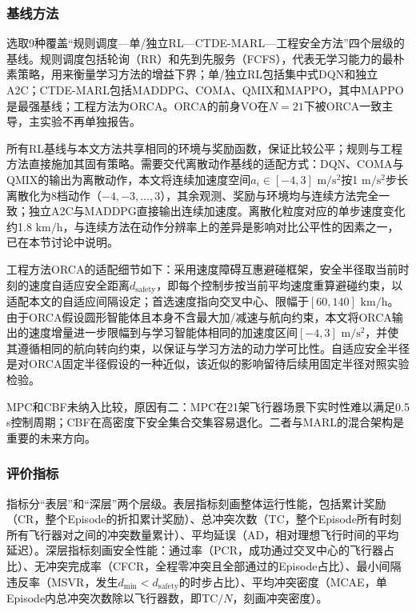 \documentclass[12pt,a4paper,UTF8]{ctexart}
\begin{document}
\subsubsection{基线方法}

选取9种覆盖“规则调度—单/独立RL—CTDE-MARL—工程安全方法”四个层级的基线。规则调度包括轮询（RR）和先到先服务（FCFS），代表无学习能力的最朴素策略，用来衡量学习方法的增益下界；单/独立RL包括集中式DQN和独立A2C；CTDE-MARL包括MADDPG、COMA、QMIX和MAPPO，其中MAPPO是最强基线；工程方法为ORCA\cite{ref4}。ORCA的前身VO在$N=21$下被ORCA一致主导，主实验不再单独报告。

所有RL基线与本文方法共享相同的环境与奖励函数，保证比较公平；规则与工程方法直接施加其固有策略。需要交代离散动作基线的适配方式：DQN、COMA与QMIX的输出为离散动作，本文将连续加速度空间$a_i\in[-4,3]$ $\mathrm{m/s^2}$按1 $\mathrm{m/s^2}$步长离散化为8档动作（$-4,-3,\ldots,3$），其余观测、奖励与环境均与连续方法完全一致；独立A2C与MADDPG直接输出连续加速度。离散化粒度对应的单步速度变化约1.8 $\mathrm{km/h}$，与连续方法在动作分辨率上的差异是影响对比公平性的因素之一，已在本节讨论中说明。

工程方法ORCA的适配细节如下：采用速度障碍互惠避碰框架，安全半径取当前时刻的速度自适应安全距离$d_{\text{safety}}$，即每个控制步按当前平均速度重算避碰约束，以适配本文的自适应间隔设定；首选速度指向交叉中心、限幅于$[60,140]$ $\mathrm{km/h}$。由于ORCA假设圆形智能体且本身不含最大加/减速与航向约束，本文将ORCA输出的速度增量进一步限幅到与学习智能体相同的加速度区间$[-4,3]$ $\mathrm{m/s^2}$，并使其遵循相同的航向转向约束，以保证与学习方法的动力学可比性。自适应安全半径是对ORCA固定半径假设的一种近似，该近似的影响留待后续用固定半径对照实验检验。

MPC和CBF未纳入比较，原因有二：MPC在21架飞行器场景下实时性难以满足0.5 s控制周期；CBF在高密度下安全集合交集容易退化。二者与MARL的混合架构是重要的未来方向。

\subsubsection{评价指标}

指标分“表层”和“深层”两个层级。表层指标刻画整体运行性能，包括累计奖励（CR，整个Episode的折扣累计奖励）、总冲突次数（TC，整个Episode所有时刻所有飞行器对之间的冲突数量累计）、平均延误（AD，相对理想飞行时间的平均延迟）。深层指标刻画安全性能：通过率（PCR，成功通过交叉中心的飞行器占比）、无冲突完成率（CFCR，全程零冲突且全部通过的Episode占比）、最小间隔违反率（MSVR，发生$d_{\min}<d_{\text{safety}}$的时步占比）、平均冲突密度（MCAE，单Episode内总冲突次数除以飞行器数，即$\mathrm{TC}/N$，刻画冲突密度）。
\end{document}
